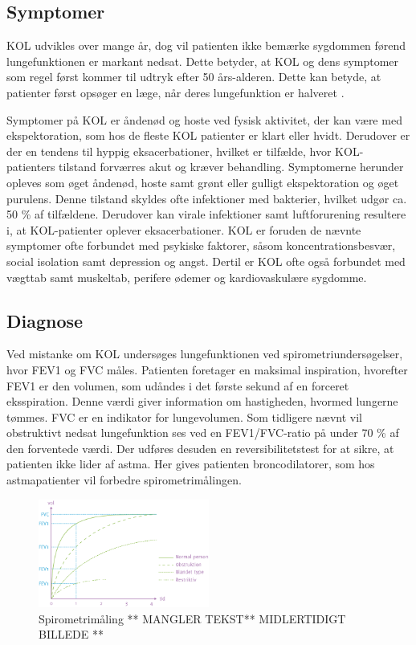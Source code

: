 \subsection{Symptomer}
KOL udvikles over mange år, dog vil patienten ikke bemærke sygdommen førend lungefunktionen er markant nedsat. Dette betyder, at KOL og dens symptomer som regel først kommer til udtryk efter 50 års-alderen\cite{Lange2015}. Dette kan betyde, at patienter først opsøger en læge, når deres lungefunktion er halveret \cite{dsam2016}.

Symptomer på KOL er åndenød og hoste ved fysisk aktivitet, der kan være med ekspektoration, som hos de fleste KOL patienter er klart eller hvidt.\cite{Basisbogen2016} Derudover er der en tendens til hyppig eksacerbationer, hvilket er tilfælde, hvor KOL-patienters tilstand forværres akut og kræver behandling. 
Symptomerne herunder opleves som øget åndenød, hoste samt grønt eller gulligt ekspektoration og øget purulens. Denne tilstand skyldes ofte infektioner med bakterier, hvilket udgør ca. 50 \% af tilfældene. Derudover kan virale infektioner samt luftforurening resultere i, at KOL-patienter oplever eksacerbationer.\cite{Basisbogen2016, dsam2016} KOL er foruden de nævnte symptomer ofte forbundet med psykiske faktorer, såsom koncentrationsbesvær, social isolation samt depression og angst. Dertil er KOL ofte også forbundet med vægttab samt muskeltab, perifere ødemer og kardiovaskulære sygdomme. \cite{dsam2016, McCarthy2015}


\subsection{Diagnose}
Ved mistanke om KOL undersøges lungefunktionen ved spirometriundersøgelser, hvor FEV1 og FVC måles. Patienten foretager en maksimal inspiration, hvorefter FEV1 er den volumen, som udåndes i det første sekund af en forceret eksspiration. Denne værdi giver information om hastigheden, hvormed lungerne tømmes. FVC er en indikator for lungevolumen. Som tidligere nævnt vil obstruktivt nedsat lungefunktion ses ved en FEV1/FVC-ratio på under 70 \% af den forventede værdi. Der udføres desuden en reversibilitetstest for at sikre, at patienten ikke lider af astma. Her gives patienten broncodilatorer, som hos astmapatienter vil forbedre spirometrimålingen.\cite{Basisbogen2016, Sundhed2013} 

\begin{figure} [H]
\centering
\includegraphics[width=0.5\textwidth]{figures/FEV}
\caption{Spirometrimåling ** MANGLER TEKST** MIDLERTIDIGT BILLEDE **}
\label{fig:FEV}
\end{figure} 


